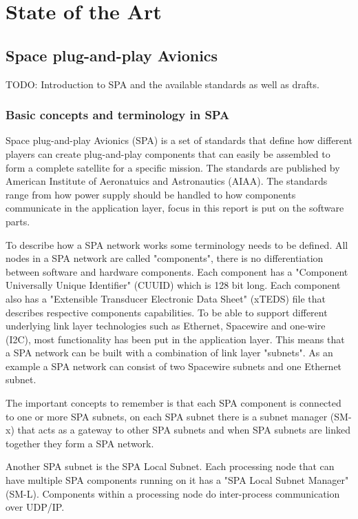 \chapter{State of the Art} \label{ch:state_of_the_art}

\section{Space plug-and-play Avionics}
TODO: Introduction to SPA and the available standards as well as drafts.

\subsection{Basic concepts and terminology in SPA}
Space plug-and-play Avionics (SPA) is a set of standards that define how
different players can create plug-and-play components that can easily be
assembled to form a complete satellite for a specific mission. The standards
are published by American Institute of Aeronatuics and Astronautics (AIAA). The
standards range from how power supply should be handled to how components
communicate in the application layer, focus in this report is put on the
software parts.

To describe how a SPA network works some terminology needs to be defined. All
nodes in a SPA network are called "components", there is no differentiation
between software and hardware components. Each component has a "Component
Universally Unique Identifier" (CUUID) which is 128 bit long. Each component
also has a "Extensible Transducer Electronic Data Sheet" (xTEDS) file that
describes respective components capabilities. To be able to support different
underlying link layer technologies such as Ethernet, Spacewire and one-wire
(I2C), most functionality has been put in the application layer. This means
that a SPA network can be built with a combination of link layer "subnets". As
an example a SPA network can consist of two Spacewire subnets and one Ethernet
subnet.

The important concepts to remember is that each SPA component is
connected to one or more SPA subnets, on each SPA subnet there is a subnet
manager (SM-x) that acts as a gateway to other SPA subnets and when SPA subnets
are linked together they form a SPA network.

Another SPA subnet is the SPA Local Subnet. Each processing node that can
have multiple SPA components running on it has a "SPA Local Subnet Manager"
(SM-L).  Components within a processing node do inter-process communication
over UDP/IP.

